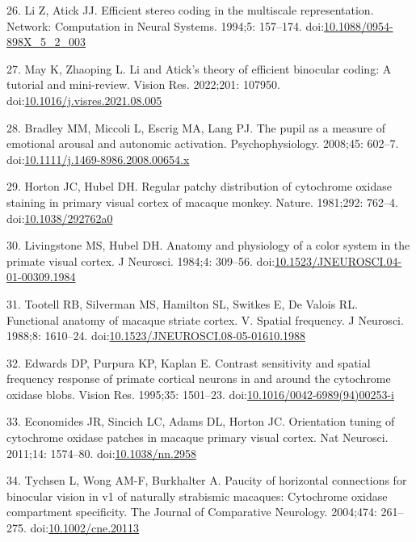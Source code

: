 \documentclass[
]{article}
\begin{document}
\leavevmode\hypertarget{ref-Li1994}{}%
26. Li Z, Atick JJ. Efficient stereo coding in the multiscale representation. Network: Computation in Neural Systems. 1994;5: 157--174. doi:\href{https://doi.org/10.1088/0954-898X_5_2_003}{10.1088/0954-898X\_5\_2\_003}

\leavevmode\hypertarget{ref-May2022}{}%
27. May K, Zhaoping L. Li and Atick's theory of efficient binocular coding: A tutorial and mini-review. Vision Res. 2022;201: 107950. doi:\href{https://doi.org/10.1016/j.visres.2021.08.005}{10.1016/j.visres.2021.08.005}

\leavevmode\hypertarget{ref-Bradley2008}{}%
28. Bradley MM, Miccoli L, Escrig MA, Lang PJ. The pupil as a measure of emotional arousal and autonomic activation. Psychophysiology. 2008;45: 602--7. doi:\href{https://doi.org/10.1111/j.1469-8986.2008.00654.x}{10.1111/j.1469-8986.2008.00654.x}

\leavevmode\hypertarget{ref-Horton1981}{}%
29. Horton JC, Hubel DH. Regular patchy distribution of cytochrome oxidase staining in primary visual cortex of macaque monkey. Nature. 1981;292: 762--4. doi:\href{https://doi.org/10.1038/292762a0}{10.1038/292762a0}

\leavevmode\hypertarget{ref-Livingstone1984}{}%
30. Livingstone MS, Hubel DH. Anatomy and physiology of a color system in the primate visual cortex. J Neurosci. 1984;4: 309--56. doi:\href{https://doi.org/10.1523/JNEUROSCI.04-01-00309.1984}{10.1523/JNEUROSCI.04-01-00309.1984}

\leavevmode\hypertarget{ref-Tootell1988}{}%
31. Tootell RB, Silverman MS, Hamilton SL, Switkes E, De Valois RL. Functional anatomy of macaque striate cortex. V. Spatial frequency. J Neurosci. 1988;8: 1610--24. doi:\href{https://doi.org/10.1523/JNEUROSCI.08-05-01610.1988}{10.1523/JNEUROSCI.08-05-01610.1988}

\leavevmode\hypertarget{ref-Edwards1995}{}%
32. Edwards DP, Purpura KP, Kaplan E. Contrast sensitivity and spatial frequency response of primate cortical neurons in and around the cytochrome oxidase blobs. Vision Res. 1995;35: 1501--23. doi:\href{https://doi.org/10.1016/0042-6989(94)00253-i}{10.1016/0042-6989(94)00253-i}

\leavevmode\hypertarget{ref-Economides2011}{}%
33. Economides JR, Sincich LC, Adams DL, Horton JC. Orientation tuning of cytochrome oxidase patches in macaque primary visual cortex. Nat Neurosci. 2011;14: 1574--80. doi:\href{https://doi.org/10.1038/nn.2958}{10.1038/nn.2958}

\leavevmode\hypertarget{ref-Tychsen2004}{}%
34. Tychsen L, Wong AM-F, Burkhalter A. Paucity of horizontal connections for binocular vision in v1 of naturally strabismic macaques: Cytochrome oxidase compartment specificity. The Journal of Comparative Neurology. 2004;474: 261--275. doi:\href{https://doi.org/10.1002/cne.20113}{10.1002/cne.20113}
\end{document}
